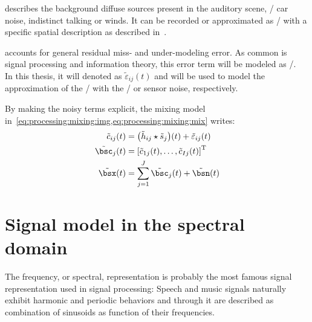  describes the background diffuse sources present in the auditory scene, \eg/ car noise, indistinct talking or winds.
It can be recorded or approximated as \AWGN/ with a specific spatial description as described in~.

 accounts for general residual miss- and under-modeling error.
As common is signal processing and information theory, this error term will be modeled as \AWGN/.
\\In this thesis, it will denoted as $\tilde{\varepsilon}_{ij}( t)$ and will be used to model the
approximation of the \RIR/ with the \ISM/ or sensor noise, respectively.

\mynewline
By making the noisy terms explicit, the mixing model in~\cref{eq:processing:mixing:img,eq:processing:mixing:mix} writes:
\begin{align}
    \tilde{\img}_{\idxMic\idxSrc}(t) &=  \kparen{\tilde{\rir}_{\idxMic\idxSrc} \convCont \tilde{\src}_\idxSrc} (t) +  \tilde{\varepsilon}_{ij}(t)\\
    \tilde{\imgs}_\idxSrc(t)         &= \ktranspose{\klist{\tilde{\img}_{1\idxSrc}(t), \dots, \tilde{\img}_{\numMics\idxSrc}(t)}} \nonumber\\
    \tilde{\mics}(t)                 &= \sum_{\idxSrc=1}^{\numSrcs} \tilde{\imgs}_\idxSrc(t) + \tilde{\bsn}( t)
\end{align}


\section{Signal model in the spectral domain}\label{sec:processing:domains}%
The frequency, or spectral, representation is probably the most famous signal representation used in signal processing:
Speech and music signals naturally exhibit harmonic and periodic behaviors and
through it are described as combination of sinusoids as function of their frequencies.

